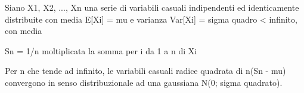\documentclass{article}
\begin{document}

Siano X1, X2, ..., Xn una serie di variabili casuali indipendenti
ed identicamente distribuite con media E[Xi] = mu e varianza
Var[Xi] = sigma quadro < infinito, con media

Sn = 1/n moltiplicata la somma per i da 1 a n di Xi

Per n che tende ad infinito, le variabili casuali
radice quadrata di n(Sn - mu) convergono in senso distribuzionale
ad una gaussiana N(0; sigma quadrato).
\end{document}
